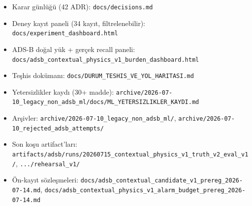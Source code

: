 \documentclass[11pt,a4paper]{article}
\newcommand{\code}[1]{\texttt{\small #1}}
\begin{document}
\begin{itemize}[leftmargin=1.2em,itemsep=1pt]
  \item Karar günlüğü (42 ADR): \code{docs/decisions.md}
  \item Deney kayıt paneli (34 kayıt, filtrelenebilir): \code{docs/experiment\_dashboard.html}
  \item ADS-B doğal yük + gerçek recall paneli: \code{docs/adsb\_contextual\_physics\_v1\_burden\_dashboard.html}
  \item Teşhis dokümanı: \code{docs/DURUM\_TESHIS\_VE\_YOL\_HARITASI.md}
  \item Yetersizlikler kaydı (30+ madde): \code{archive/2026-07-10\_legacy\_non\_adsb\_ml/docs/ML\_YETERSIZLIKLER\_KAYDI.md}
  \item Arşivler: \code{archive/2026-07-10\_legacy\_non\_adsb\_ml/}, \code{archive/2026-07-10\_rejected\_adsb\_attempts/}
  \item Son koşu artifact'ları: \code{artifacts/adsb/runs/20260715\_contextual\_physics\_v1\_truth\_v2\_eval\_v1/}, \code{.../rehearsal\_v1/}
  \item Ön-kayıt sözleşmeleri: \code{docs/adsb\_contextual\_candidate\_v1\_prereg\_2026-07-14.md}, \code{docs/adsb\_contextual\_physics\_v1\_alarm\_budget\_prereg\_2026-07-14.md}
\end{itemize}
\end{document}
